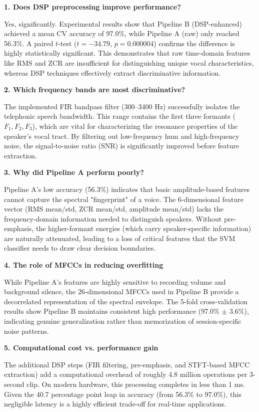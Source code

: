 \textbf{1. Does DSP preprocessing improve performance?}

Yes, significantly. Experimental results show that Pipeline B (DSP-enhanced) achieved a mean CV accuracy of 97.0\%, while Pipeline A (raw) only reached 56.3\%. A paired $t$-test ($t = -34.79$, $p = 0.000004$) confirms the difference is highly statistically significant. This demonstrates that raw time-domain features like RMS and ZCR are insufficient for distinguishing unique vocal characteristics, whereas DSP techniques effectively extract discriminative information.

\textbf{2. Which frequency bands are most discriminative?}

The implemented FIR bandpass filter (300--3400 Hz) successfully isolates the telephonic speech bandwidth. This range contains the first three formants ($F_1, F_2, F_3$), which are vital for characterizing the resonance properties of the speaker's vocal tract. By filtering out low-frequency hum and high-frequency noise, the signal-to-noise ratio (SNR) is significantly improved before feature extraction.

\textbf{3. Why did Pipeline A perform poorly?}

Pipeline A's low accuracy (56.3\%) indicates that basic amplitude-based features cannot capture the spectral "fingerprint" of a voice. The 6-dimensional feature vector (RMS mean/std, ZCR mean/std, amplitude mean/std) lacks the frequency-domain information needed to distinguish speakers. Without pre-emphasis, the higher-formant energies (which carry speaker-specific information) are naturally attenuated, leading to a loss of critical features that the SVM classifier needs to draw clear decision boundaries.

\textbf{4. The role of MFCCs in reducing overfitting}

While Pipeline A's features are highly sensitive to recording volume and background silence, the 26-dimensional MFCCs used in Pipeline B provide a decorrelated representation of the spectral envelope. The 5-fold cross-validation results show Pipeline B maintains consistent high performance (97.0\% $\pm$ 3.6\%), indicating genuine generalization rather than memorization of session-specific noise patterns.

\textbf{5. Computational cost vs. performance gain}

The additional DSP steps (FIR filtering, pre-emphasis, and STFT-based MFCC extraction) add a computational overhead of roughly 4.8 million operations per 3-second clip. On modern hardware, this processing completes in less than 1 ms. Given the 40.7 percentage point leap in accuracy (from 56.3\% to 97.0\%), this negligible latency is a highly efficient trade-off for real-time applications.

